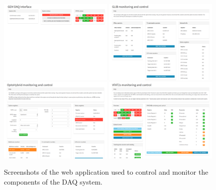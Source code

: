       \begin{figure}[h!]
        \centering
        \includegraphics[width=0.49\textwidth]{img/II-3-test-beam/app-home.png}
        \includegraphics[width=0.49\textwidth]{img/II-3-test-beam/app-glib.png} \\
        \vspace*{0.3cm}
        \includegraphics[width=0.49\textwidth]{img/II-3-test-beam/app-oh.png}
        \includegraphics[width=0.49\textwidth]{img/II-3-test-beam/app-vfat2.png}
        \caption{Screenshots of the web application used to control and monitor the components of the DAQ system.}
        \label{fig:II-3-app-monitoring}
      \end{figure}

